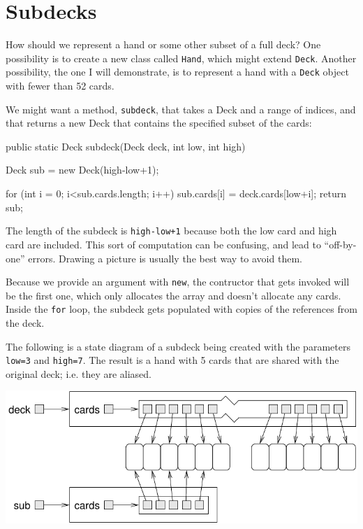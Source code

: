 \section{Subdecks}

How should we represent a hand or some other subset of a full deck?
One possibility is to create a new class called {\tt Hand}, which
might extend {\tt Deck}.  Another possibility, the one I will
demonstrate, is to represent a hand with a {\tt Deck} object with
fewer than 52 cards.

We might want a method, {\tt subdeck}, that takes a Deck
and a range of indices, and that returns a new Deck that
contains the specified subset of the cards:

\begin{code}
public static Deck subdeck(Deck deck, int low, int high) {
    Deck sub = new Deck(high-low+1);

    for (int i = 0; i<sub.cards.length; i++) {
        sub.cards[i] = deck.cards[low+i];
    }
    return sub;
}
\end{code}

The length of the subdeck is {\tt high-low+1} because both the low
card and high card are included.  This sort of computation can be
confusing, and lead to ``off-by-one'' errors.  Drawing a picture is
usually the best way to avoid them.

Because we provide an argument with {\tt new}, the
contructor that gets invoked will be the first one, which only
allocates the array and doesn't allocate any cards.  Inside the
{\tt for} loop, the subdeck gets populated with copies of the
references from the deck.

The following is a state diagram of a subdeck being created with the
parameters {\tt low=3} and {\tt high=7}.  The result is a hand with 5
cards that are shared with the original deck; i.e. they are aliased.

\includegraphics{figs/subdeck.pdf}

